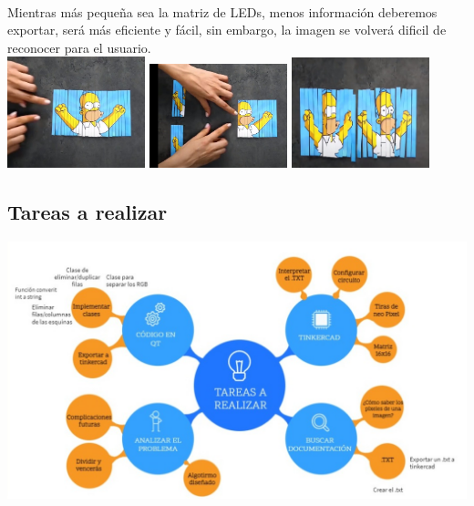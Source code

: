 \documentclass{article}
\begin{document}
\\Mientras más pequeña sea la matriz de LEDs, menos información deberemos exportar, será más eficiente y fácil, sin embargo, la imagen se volverá dificil de reconocer para el usuario.\\

\includegraphics[width=4cm]{Imagenes/recorte1.jpeg}
\includegraphics[width=4cm]{Imagenes/recorte2.jpeg}
\includegraphics[width=4cm]{Imagenes/recorte3.jpeg}
\vspace{0,3cm}

\subsection{Tareas a realizar}
\includegraphics[width=15cm]{Imagenes/Esquema.jpeg}
\end{document}
